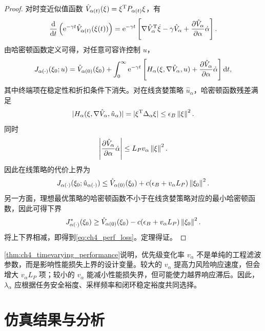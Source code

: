 \begin{proof}
对时变近似值函数 $\hat V_{\alpha(t)}(\xi)=\xi^{\mathrm{T}}P_{\alpha(t)}\xi$，有
\begin{equation}
  \frac{\mathrm{d}}{\mathrm{d} t}\left(\mathrm{e}^{-\gamma t}\hat V_{\alpha(t)}(\xi(t))\right)=\mathrm{e}^{-\gamma t}\left[\nabla \hat V_\alpha^{\mathrm{T}}\dot\xi-\gamma\hat V_\alpha+\frac{\partial \hat V_\alpha}{\partial\alpha}\dot\alpha\right].
\end{equation}
由哈密顿函数定义可得，对任意可容许控制 $u$，
\begin{equation}
  J_{\alpha(\cdot)}(\xi_0;u)=\hat V_{\alpha(0)}(\xi_0)+\int_0^\infty\mathrm{e}^{-\gamma t}\left[H_\alpha(\xi,\nabla\hat V_\alpha,u)+\frac{\partial \hat V_\alpha}{\partial\alpha}\dot\alpha\right]\mathrm{d} t,
  \label{eq:ch4_J_identity_timevarying}
\end{equation}
其中终端项在稳定性和折扣条件下消失。对在线贪婪策略 $\hat u_\alpha$，哈密顿函数残差满足
\begin{equation}
  |H_\alpha(\xi,\nabla\hat V_\alpha,
  \hat u_\alpha)|=|\xi^{\mathrm{T}}\Delta_\alpha\xi|\le\epsilon_B\left\lVert \xi\right\rVert^2 .
\end{equation}
同时
\begin{equation}
  \left|\frac{\partial \hat V_\alpha}{\partial\alpha}\dot\alpha\right|\le L_Pv_\alpha\left\lVert \xi\right\rVert^2 .
\end{equation}
因此在线策略的代价上界为
\begin{equation}
  J_{\alpha(\cdot)}(\xi_0;\hat u_{\alpha(\cdot)})\le \hat V_{\alpha(0)}(\xi_0)+c(\epsilon_B+v_\alpha L_P)\left\lVert \xi_0\right\rVert^2 .
\end{equation}
另一方面，理想最优策略的哈密顿函数不小于在线贪婪策略对应的最小哈密顿函数，因此可得下界
\begin{equation}
  J_{\alpha(\cdot)}^*(\xi_0)\ge \hat V_{\alpha(0)}(\xi_0)-c(\epsilon_B+v_\alpha L_P)\left\lVert \xi_0\right\rVert^2 .
\end{equation}
将上下界相减，即得到\eqref{eq:ch4_perf_loss}。定理得证。
\end{proof}

\begin{remark}
\cref{thm:ch4_timevarying_performance}说明，优先级变化率 $v_\alpha$ 不是单纯的工程滤波参数，而是影响性能损失上界的设计变量。较大的 $v_\alpha$ 提高力风险响应速度，但会增大 $v_\alpha L_P$ 项；较小的 $v_\alpha$ 能减小性能损失界，但可能使力越界响应滞后。因此，$\lambda_\alpha$ 应根据任务安全裕度、采样频率和闭环稳定裕度共同选择。
\end{remark}

\section{仿真结果与分析}
\label{sec:ch4_simulation}


